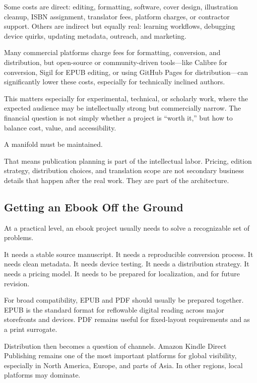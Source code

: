 Some costs are direct: editing, formatting, software, cover design,
illustration cleanup, ISBN assignment, translator fees, platform
charges, or contractor support. Others are indirect but equally real:
learning workflows, debugging device quirks, updating metadata,
outreach, and marketing.

Many commercial platforms charge fees for formatting, conversion, and
distribution, but open-source or community-driven tools---like Calibre
for conversion, Sigil for EPUB editing, or using GitHub Pages for
distribution---can significantly lower these costs, especially for
technically inclined authors.

This matters especially for experimental, technical, or scholarly work,
where the expected audience may be intellectually strong but
commercially narrow. The financial question is not simply whether a
project is ``worth it,'' but how to balance cost, value, and
accessibility.

A manifold must be maintained.

That means publication planning is part of the intellectual labor.
Pricing, edition strategy, distribution choices, and translation scope
are not secondary business details that happen after the real work. They
are part of the architecture.

\hypertarget{getting-an-ebook-off-the-ground}{%
\subsection{Getting an Ebook Off the
Ground}\label{getting-an-ebook-off-the-ground}}

At a practical level, an ebook project usually needs to solve a
recognizable set of problems.

It needs a stable source manuscript. It needs a reproducible conversion
process. It needs clean metadata. It needs device testing. It needs a
distribution strategy. It needs a pricing model. It needs to be prepared
for localization, and for future revision.

For broad compatibility, EPUB and PDF should usually be prepared
together. EPUB is the standard format for reflowable digital reading
across major storefronts and devices. PDF remains useful for
fixed-layout requirements and as a print surrogate.

Distribution then becomes a question of channels. Amazon Kindle Direct
Publishing remains one of the most important platforms for global
visibility, especially in North America, Europe, and parts of Asia. In
other regions, local platforms may dominate.

